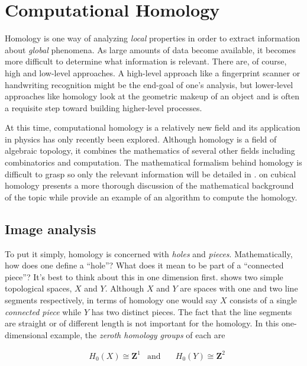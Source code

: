 \chapter{Computational Homology}

Homology is one way of analyzing \textit{local} properties in order to extract information about \textit{global} phenomena. As large amounts of data become available, it becomes more difficult to determine what information is relevant. There are, of course, high and low-level approaches. A high-level approach like a fingerprint scanner or handwriting recognition might be the end-goal of one's analysis, but lower-level approaches like homology look at the geometric makeup of an object and is often a requisite step toward building higher-level processes.

	At this time, computational homology is a relatively new field and its application in physics has only recently been explored. Although homology is a field of algebraic topology, it combines the mathematics of several other fields including combinatorics and computation. The mathematical formalism behind homology is difficult to grasp so only the relevant information will be detailed in .  on cubical homology presents a more thorough discussion of the mathematical background of the topic while  provide an example of an algorithm to compute the homology.
	
\section{Image analysis} \label{ch2:imageanalysis}

To put it simply, homology is concerned with \textit{holes} and \textit{pieces}. Mathematically, how does one define a ``hole''? What does it mean to be part of a ``connected piece''? It's best to think about this in one dimension first.  shows two simple topological spaces, $X$ and $Y$. Although $X$ and $Y$ are spaces with one and two line segments respectively, in terms of homology one would say $X$ consists of a single \textit{connected piece} while $Y$ has two distinct pieces. The fact that the line segments are straight or of different length is not important for the homology. In this one-dimensional example, the \textit{zeroth homology groups} of each are

\begin{align}
	& H_0(X) \cong \mathbf{Z}^1  & \text{and} & \quad H_0(Y) \cong \mathbf{Z}^2
	\label{eq:homology1d}
\end{align}

